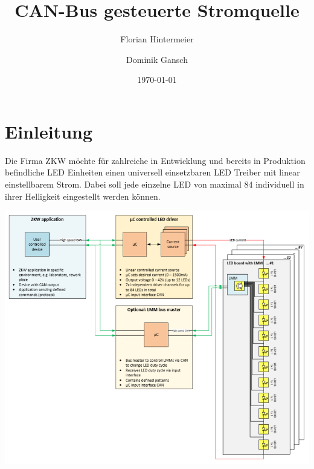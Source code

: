 \documentclass[paper=a4, 12pt]{scrreprt}
\title{CAN-Bus gesteuerte Stromquelle}
\author{Florian Hintermeier \and Dominik Gansch}
\date{\today}
\begin{document}
\frontmatter

\maketitle




\tableofcontents

\mainmatter

\chapter{Einleitung}
    Die Firma ZKW möchte für zahlreiche in Entwicklung und bereits in Produktion befindliche LED Einheiten einen universell einsetzbaren LED Treiber mit linear einstellbarem Strom. Dabei soll jede einzelne LED von maximal 84 individuell in ihrer Helligkeit eingestellt werden können.
    
	\begin{adjustbox}{center,caption={Blockschaltbild von ZKW},label={ZKW-Blockschaltbild},nofloat=figure,vspace=\bigskipamount}
	\includegraphics[width=\textwidth]{img/ZKW_Blockschaltbild.PNG}
	\end{adjustbox}
\end{document}
